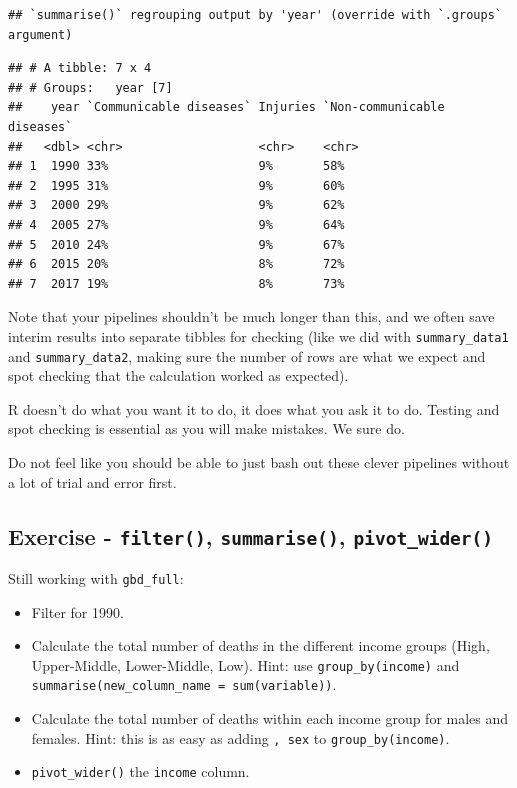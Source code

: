 \documentclass[
  12pt,
  krantz2]{krantz}
\renewenvironment{quote}{\begin{VF}}{\end{VF}}
\begin{document}
\begin{verbatim}
## `summarise()` regrouping output by 'year' (override with `.groups` argument)
\end{verbatim}

\begin{verbatim}
## # A tibble: 7 x 4
## # Groups:   year [7]
##    year `Communicable diseases` Injuries `Non-communicable diseases`
##   <dbl> <chr>                   <chr>    <chr>                      
## 1  1990 33%                     9%       58%                        
## 2  1995 31%                     9%       60%                        
## 3  2000 29%                     9%       62%                        
## 4  2005 27%                     9%       64%                        
## 5  2010 24%                     9%       67%                        
## 6  2015 20%                     8%       72%                        
## 7  2017 19%                     8%       73%
\end{verbatim}

Note that your pipelines shouldn't be much longer than this, and we often save interim results into separate tibbles for checking (like we did with \texttt{summary\_data1} and \texttt{summary\_data2}, making sure the number of rows are what we expect and spot checking that the calculation worked as expected).

\begin{quote}
R doesn't do what you want it to do, it does what you ask it to do. Testing and spot checking is essential as you will make mistakes. We sure do.
\end{quote}

Do not feel like you should be able to just bash out these clever pipelines without a lot of trial and error first.

\hypertarget{exercise---filter-summarise-pivot_wider}{%
\subsection{\texorpdfstring{Exercise - \texttt{filter()}, \texttt{summarise()}, \texttt{pivot\_wider()}}{Exercise - filter(), summarise(), pivot\_wider()}}\label{exercise---filter-summarise-pivot_wider}}

Still working with \texttt{gbd\_full}:

\begin{itemize}
\item
  Filter for 1990.
\item
  Calculate the total number of deaths in the different income groups (High, Upper-Middle, Lower-Middle, Low). Hint: use \texttt{group\_by(income)} and \texttt{summarise(new\_column\_name\ =\ sum(variable))}.
\item
  Calculate the total number of deaths within each income group for males and females. Hint: this is as easy as adding \texttt{,\ sex} to \texttt{group\_by(income)}.
\item
  \texttt{pivot\_wider()} the \texttt{income} column.
\end{itemize}
\end{document}
